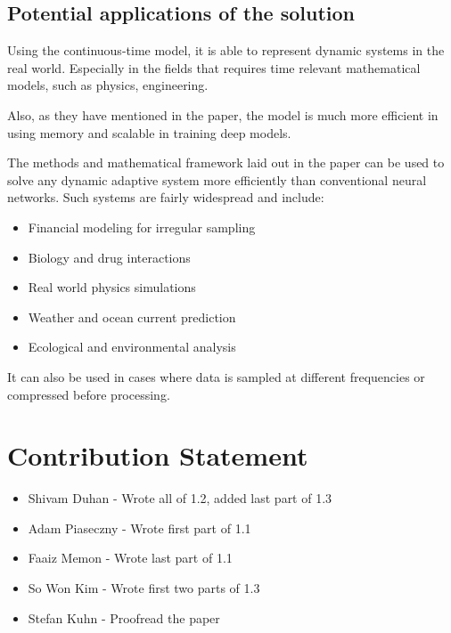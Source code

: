 \documentclass{article}
\begin{document}
\subsection{Potential applications of the solution}
Using the continuous-time model, it is able to represent dynamic systems in the real world. Especially in the fields that requires time relevant mathematical models, such as physics, engineering.

Also, as they have mentioned in the paper, the model is much more efficient in using memory and scalable in training deep models.

The methods and mathematical framework laid out in the paper can be used to solve any dynamic adaptive system more efficiently than conventional neural networks. Such systems are fairly widespread and include:

\begin{itemize}
    \item Financial modeling for irregular sampling
    \item Biology and drug interactions
    \item Real world physics simulations
    \item Weather and ocean current prediction
    \item Ecological and environmental analysis
\end{itemize}

It can also be used in cases where data is sampled at different frequencies or compressed before processing.

\section{Contribution Statement}
\begin{itemize}
    \item Shivam Duhan - Wrote all of 1.2, added last part of 1.3
    \item Adam Piaseczny - Wrote first part of 1.1
    \item Faaiz Memon - Wrote last part of 1.1
    \item So Won Kim - Wrote first two parts of 1.3
    \item Stefan Kuhn - Proofread the paper
\end{itemize}
    
\end{document}
